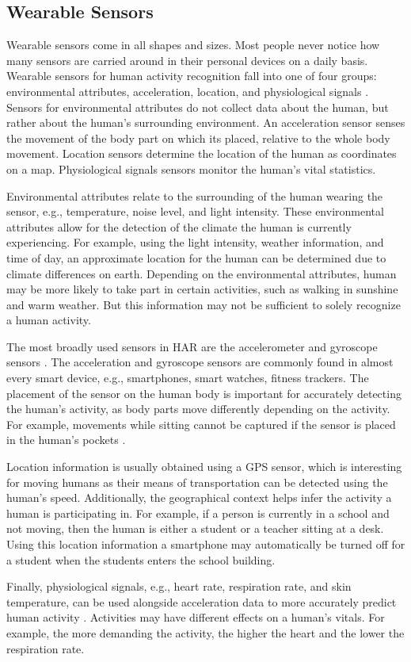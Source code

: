 \subsection{Wearable Sensors}
Wearable sensors come in all shapes and sizes. Most people never notice how many sensors are carried around in their personal devices on a daily basis. Wearable sensors for human activity recognition fall into one of four groups: environmental attributes, acceleration, location, and physiological signals \cite{Lara2013}. Sensors for environmental attributes do not collect data about the human, but rather about the human's surrounding environment. An acceleration sensor senses the movement of the body part on which its placed, relative to the whole body movement. Location sensors determine the location of the human as coordinates on a map. Physiological signals sensors monitor the human's vital statistics.
\par Environmental attributes relate to the surrounding of the human wearing the sensor, e.g., temperature, noise level, and light intensity. These environmental attributes allow for the detection of the climate the human is currently experiencing. For example, using the light intensity, weather information, and time of day, an approximate location for the human can be determined due to climate differences on earth. Depending on the environmental attributes, human may be more likely to take part in certain activities, such as walking in sunshine and warm weather. But this information may not be sufficient to solely recognize a human activity.
\par The most broadly used sensors in HAR are the accelerometer and gyroscope sensors \cite{Lara2013}. The acceleration and gyroscope sensors are commonly found in almost every smart device, e.g., smartphones, smart watches, fitness trackers. The placement of the sensor on the human body is important for accurately detecting the human's activity, as body parts move differently depending on the activity. For example, movements while sitting cannot be captured if the sensor is placed in the human's pockets \cite{Maurer2006}.
\par Location information is usually obtained using a GPS sensor, which is interesting for moving humans as their means of transportation can be detected using the human's speed. Additionally, the geographical context helps infer the activity a human is participating in. For example, if a person is currently in a school and not moving, then the human is either a student or a teacher sitting at a desk. Using this location information a smartphone may automatically be turned off for a student when the students enters the school building.
\par Finally, physiological signals, e.g., heart rate, respiration rate, and skin temperature, can be used alongside acceleration data to more accurately predict human activity \cite{Lara2012}. Activities may have different effects on a human's vitals. For example, the more demanding the activity, the higher the heart and the lower the respiration rate.

